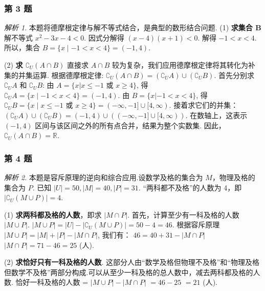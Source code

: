 \documentclass[12pt,a4paper]{ctexbook}
\theoremstyle{definition}
\theoremstyle{remark}
\newtheorem*{solution}{解析}
\begin{document}
	\subsubsection*{第 3 题}
	\begin{solution}
		本题将德摩根定律与解不等式结合，是典型的数形结合问题.
		(1) \textbf{求集合 B}
		解不等式 $x^2-3x-4<0$.
		因式分解得 $(x-4)(x+1)<0$.
		解得 $-1 < x < 4$.
		所以，集合 $B=\{x \mid -1 < x < 4\} = (-1, 4)$.
		
		(2) \textbf{求 $\complement_U(A \cap B)$}
		直接求 $A \cap B$ 较为复杂，我们应用德摩根定律将其转化为补集的并集运算.
		根据德摩根定律: $\complement_U(A \cap B) = (\complement_U A) \cup (\complement_U B)$.
		首先分别求 $\complement_U A$ 和 $\complement_U B$:
		由 $A=\{x|x \le -1 \text{ 或 } x \ge 4\}$, 得 $\complement_U A = \{x \mid -1 < x < 4\} = (-1, 4)$.
		由 $B=\{x|-1 < x < 4\}$, 得 $\complement_U B = \{x \mid x \le -1 \text{ 或 } x \ge 4\} = (-\infty, -1] \cup [4, \infty)$.
		接着求它们的并集：
		$(\complement_U A) \cup (\complement_U B) = (-1, 4) \cup ((-\infty, -1] \cup [4, \infty))$.
		在数轴上，这表示 $(-1, 4)$ 区间与该区间之外的所有点合并，结果为整个实数集.
		因此，$\complement_U(A \cap B) = \mathbb{R}$.
	\end{solution}
	
	\subsubsection*{第 4 题}
	\begin{solution}
		本题是容斥原理的逆向和综合应用.设数学及格的集合为 $M$，物理及格的集合为 $P$.
		已知 $|U|=50, |M|=40, |P|=31$.
		“两科都不及格”的人数为 4，即 $|\complement_U(M \cup P)|=4$.
		
		(1) \textbf{求两科都及格的人数}，即求 $|M \cap P|$.
		首先，计算至少有一科及格的人数 $|M \cup P|$.
		$|M \cup P| = |U| - |\complement_U(M \cup P)| = 50 - 4 = 46$.
		根据容斥原理 $|M \cup P| = |M| + |P| - |M \cap P|$, 我们有：
		$46 = 40 + 31 - |M \cap P|$
		$|M \cap P| = 71 - 46 = 25$ (人).
		
		(2) \textbf{求恰好只有一科及格的人数}.
		这部分人由“数学及格但物理不及格”和“物理及格但数学不及格”两部分构成.可以从至少一科及格的总人数中，减去两科都及格的人数.
		恰好一科及格的人数 = $|M \cup P| - |M \cap P|$
		$= 46 - 25$
		$= 21$ (人).
	\end{solution}
	
\end{document}
